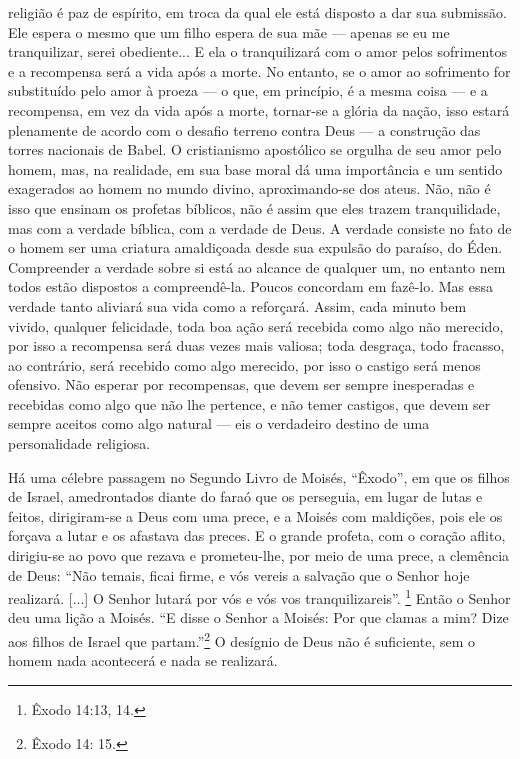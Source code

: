 religião é paz de espírito, em troca da qual ele está disposto a dar sua
submissão. Ele espera o mesmo que um filho espera de sua mãe --- apenas
se eu me tranquilizar, serei obediente... E ela o tranquilizará com o
amor pelos sofrimentos e a recompensa será a vida após a morte. No
entanto, se o amor ao sofrimento for substituído pelo amor à proeza ---
o que, em princípio, é a mesma coisa --- e a recompensa, em vez da vida
após a morte, tornar-se a glória da nação, isso estará plenamente de
acordo com o desafio terreno contra Deus --- a construção das torres
nacionais de Babel. O cristianismo apostólico se orgulha de seu amor
pelo homem, mas, na realidade, em sua base moral dá uma importância e um
sentido exagerados ao homem no mundo divino, aproximando-se dos ateus.
Não, não é isso que ensinam os profetas bíblicos, não é assim que eles
trazem tranquilidade, mas com a verdade bíblica, com a verdade de Deus.
A verdade consiste no fato de o homem ser uma criatura amaldiçoada desde
sua expulsão do paraíso, do Éden. Compreender a verdade sobre si está ao
alcance de qualquer um, no entanto nem todos estão dispostos a
compreendê-la. Poucos concordam em fazê-lo. Mas essa verdade tanto
aliviará sua vida como a reforçará. Assim, cada minuto bem vivido,
qualquer felicidade, toda boa ação será recebida como algo não merecido,
por isso a recompensa será duas vezes mais valiosa; toda desgraça, todo
fracasso, ao contrário, será recebido como algo merecido, por isso o
castigo será menos ofensivo. Não esperar por recompensas, que devem ser
sempre inesperadas e recebidas como algo que não lhe pertence, e não
temer castigos, que devem ser sempre aceitos como algo natural --- eis o
verdadeiro destino de uma personalidade religiosa.

Há uma célebre passagem no Segundo Livro de Moisés, ``Êxodo'', em que os
filhos de Israel, amedrontados diante do faraó que os perseguia, em
lugar de lutas e feitos, dirigiram-se a Deus com uma prece, e a Moisés
com maldições, pois ele os forçava a lutar e os afastava das preces. E o
grande profeta, com o coração aflito, dirigiu-se ao povo que rezava e
prometeu-lhe, por meio de uma prece, a clemência de Deus: ``Não temais,
ficai firme, e vós vereis a salvação que o Senhor hoje realizará.
{[}...{]} O Senhor lutará por vós e vós vos tranquilizareis''.
\footnote{Êxodo 14:13, 14.} Então o Senhor deu uma lição a Moisés. ``E
disse o Senhor a Moisés: Por que clamas a mim? Dize aos filhos de Israel
que partam.''\footnote{Êxodo 14: 15.} O desígnio de Deus não é
suficiente, sem o homem nada acontecerá e nada se realizará.

